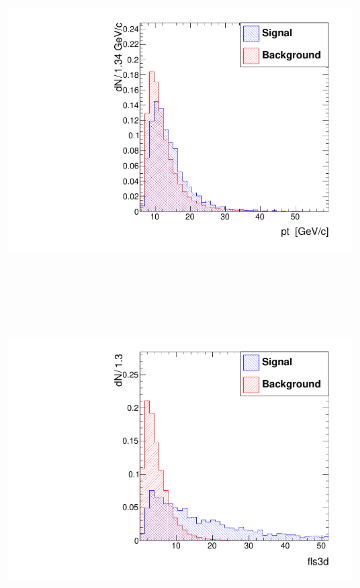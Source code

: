 \documentclass[10pt,a4paper]{article}
\begin{document}
\begin{figure}
        \centering
        \begin{subfigure}[b]{0.2\textwidth}
                \centering
                \includegraphics[width=\textwidth]{Figures/pt_endcaps}
                \label{fig:ptEndcaps}
        \end{subfigure}
        ~
        \begin{subfigure}[b]{0.2\textwidth}
                \centering
                \label{fig:etaEndcaps}
        \end{subfigure}
        ~
        \begin{subfigure}[b]{0.2\textwidth}
                \centering
                \includegraphics[width=\textwidth]{Figures/fls3d_endcaps}

\end{subfigure}
\end{figure}
\end{document}
